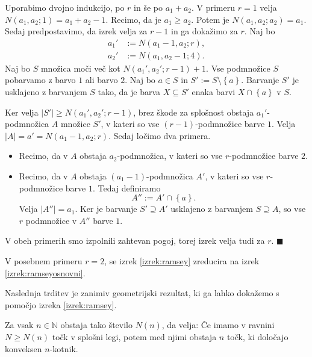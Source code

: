 \documentclass[twoside,11pt]{article}
\providecommand{\set}[1]{\left\{#1\right\}}
\providecommand{\abs}[1]{\left\lvert #1\right\rvert}
\begin{document}
\begin{dokaz}
    Uporabimo dvojno indukcijo, po $r$ in še po $a_1 + a_2$. 
    V primeru $r = 1$ velja $N(a_1, a_2; 1) = a_1 + a_2 -1$. Recimo, da je $a_1 \ge a_2$. Potem je 
    $N(a_1, a_2; a_2) = a_1$. Sedaj predpostavimo, da izrek velja za $r-1$ in ga dokažimo za $r$.
    Naj bo
    \begin{align*}
        a_1' &:= N(a_1 - 1, a_2; r), \\
        a_2' &:= N(a_1, a_2 -1; 4).
    \end{align*}
    Naj bo $S$ množica moči več kot $N(a_1', a_2'; r-1) + 1$. Vse podmnožice $S$ pobarvamo z 
    barvo $1$ ali barvo $2$. Naj bo $a \in S$ in $S' := S \setminus \set{a}$. Barvanje $S'$ je 
    usklajeno z barvanjem $S$ tako, da je barva $X \subseteq S'$ enaka barvi $X \cap \set{a}$ v $S$.

    Ker velja $\abs{S'} \ge N(a_1', a_2';r-1)$, brez škode za splošnost obstaja $a_1'$-podmnožica $A$ 
    množice $S'$, v kateri so vse $(r-1)$-podmnožice barve $1$. Velja $\abs{A} = a' = N(a_1-1,a_2;r)$.
    Sedaj ločimo dva primera.
    \begin{itemize}
        \item Recimo, da v $A$ obstaja $a_2$-podmnožica, v kateri so vse $r$-podmnožice barve $2$.
        \item Recimo, da v $A$ obstaja $(a_1-1)$-podmnožica $A'$, v kateri so vse $r$-podmnožice barve $1$. 
        Tedaj definiramo
        \[
            A'' := A' \cap \set{a}.
        \]
        Velja $\abs{A''} = a_1$. Ker je barvanje $S' \supseteq A'$ usklajeno z barvanjem $S \supseteq A$, 
        so vse $r$ podmnožice v $A''$ barve $1$.
    \end{itemize}
    V obeh primerih smo izpolnili zahtevan pogoj, torej izrek velja tudi za $r$. \hfill $\blacksquare$
\end{dokaz}

V posebnem primeru $r = 2$, se izrek \ref{izrek:ramsey} zreducira 
na izrek \ref{izrek:ramseyosnovni}.

Naslednja trditev je zanimiv geometrijski rezultat, ki ga lahko dokažemo 
s pomočjo izreka \ref{izrek:ramsey}. 

\begin{izrek} \label{izrek:happyend}
    Za vsak $n \in \mathbb{N}$ obstaja tako število $N(n)$, da velja: Če imamo v ravnini $N \ge N(n)$
    točk v splošni legi, potem med njimi obstaja $n$ točk, ki določajo konveksen $n$-kotnik.
\end{izrek}
\end{document}
